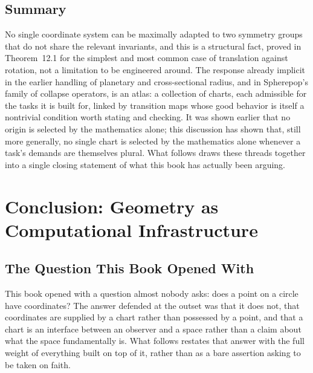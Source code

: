 \documentclass[11pt,fleqn]{book}
\numberwithin{equation}{chapter}
\theoremstyle{plain}
\theoremstyle{definition}
\theoremstyle{remark}
\begin{document}
\section{Summary}

No single coordinate system can be maximally adapted to two symmetry groups that do not share the relevant invariants, and this is a structural fact, proved in Theorem~12.1 for the simplest and most common case of translation against rotation, not a limitation to be engineered around. The response already implicit in the earlier handling of planetary and cross-sectional radius, and in Spherepop's family of collapse operators, is an atlas: a collection of charts, each admissible for the tasks it is built for, linked by transition maps whose good behavior is itself a nontrivial condition worth stating and checking. It was shown earlier that no origin is selected by the mathematics alone; this discussion has shown that, still more generally, no single chart is selected by the mathematics alone whenever a task's demands are themselves plural. What follows draws these threads together into a single closing statement of what this book has actually been arguing.



\chapter{Conclusion: Geometry as Computational Infrastructure}

\section{The Question This Book Opened With}

This book opened with a question almost nobody asks: does a point on a circle have coordinates? The answer defended at the outset was that it does not, that coordinates are supplied by a chart rather than possessed by a point, and that a chart is an interface between an observer and a space rather than a claim about what the space fundamentally is. What follows restates that answer with the full weight of everything built on top of it, rather than as a bare assertion asking to be taken on faith.
\end{document}

